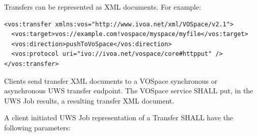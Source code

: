 \documentclass[11pt,a4paper]{ivoa}
\begin{document}
Transfers can be represented as XML documents.  For example:

\begin{verbatim}
<vos:transfer xmlns:vos="http://www.ivoa.net/xml/VOSpace/v2.1">
  <vos:target>vos://example.com!vospace/myspace/myfile</vos:target>
  <vos:direction>pushToVoSpace</vos:direction>
  <vos:protocol uri="ivo://ivoa.net/vospace/core#httpput" />
</vos:transfer>
\end{verbatim}

Clients send transfer XML documents to a VOSpace synchronous or asynchronous UWS transfer endpoint.  The VOSpace service SHALL put, in the UWS Job results, a resulting transfer XML document.

A client initiated UWS Job representation of a Transfer SHALL have the following parameters:
\end{document}
